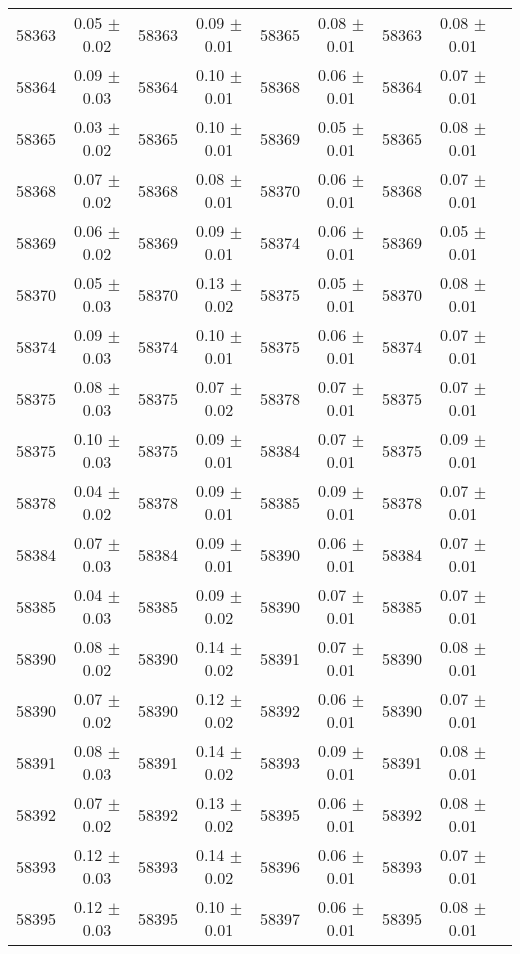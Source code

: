 \begin{center}
\begin{longtable}{ccccccccc}
58363 & 0.05 $\pm$ 0.02 & 58363 & 0.09 $\pm$ 0.01 & 58365 & 0.08 $\pm$ 0.01 & 58363 & 0.08 $\pm$ 0.01 & \\
58364 & 0.09 $\pm$ 0.03 & 58364 & 0.10 $\pm$ 0.01 & 58368 & 0.06 $\pm$ 0.01 & 58364 & 0.07 $\pm$ 0.01 & \\
58365 & 0.03 $\pm$ 0.02 & 58365 & 0.10 $\pm$ 0.01 & 58369 & 0.05 $\pm$ 0.01 & 58365 & 0.08 $\pm$ 0.01 & \\
58368 & 0.07 $\pm$ 0.02 & 58368 & 0.08 $\pm$ 0.01 & 58370 & 0.06 $\pm$ 0.01 & 58368 & 0.07 $\pm$ 0.01 & \\
58369 & 0.06 $\pm$ 0.02 & 58369 & 0.09 $\pm$ 0.01 & 58374 & 0.06 $\pm$ 0.01 & 58369 & 0.05 $\pm$ 0.01 & \\
58370 & 0.05 $\pm$ 0.03 & 58370 & 0.13 $\pm$ 0.02 & 58375 & 0.05 $\pm$ 0.01 & 58370 & 0.08 $\pm$ 0.01 & \\
58374 & 0.09 $\pm$ 0.03 & 58374 & 0.10 $\pm$ 0.01 & 58375 & 0.06 $\pm$ 0.01 & 58374 & 0.07 $\pm$ 0.01 & \\
58375 & 0.08 $\pm$ 0.03 & 58375 & 0.07 $\pm$ 0.02 & 58378 & 0.07 $\pm$ 0.01 & 58375 & 0.07 $\pm$ 0.01 & \\
58375 & 0.10 $\pm$ 0.03 & 58375 & 0.09 $\pm$ 0.01 & 58384 & 0.07 $\pm$ 0.01 & 58375 & 0.09 $\pm$ 0.01 & \\
58378 & 0.04 $\pm$ 0.02 & 58378 & 0.09 $\pm$ 0.01 & 58385 & 0.09 $\pm$ 0.01 & 58378 & 0.07 $\pm$ 0.01 & \\
58384 & 0.07 $\pm$ 0.03 & 58384 & 0.09 $\pm$ 0.01 & 58390 & 0.06 $\pm$ 0.01 & 58384 & 0.07 $\pm$ 0.01 & \\
58385 & 0.04 $\pm$ 0.03 & 58385 & 0.09 $\pm$ 0.02 & 58390 & 0.07 $\pm$ 0.01 & 58385 & 0.07 $\pm$ 0.01 & \\
58390 & 0.08 $\pm$ 0.02 & 58390 & 0.14 $\pm$ 0.02 & 58391 & 0.07 $\pm$ 0.01 & 58390 & 0.08 $\pm$ 0.01 & \\
58390 & 0.07 $\pm$ 0.02 & 58390 & 0.12 $\pm$ 0.02 & 58392 & 0.06 $\pm$ 0.01 & 58390 & 0.07 $\pm$ 0.01 & \\
58391 & 0.08 $\pm$ 0.03 & 58391 & 0.14 $\pm$ 0.02 & 58393 & 0.09 $\pm$ 0.01 & 58391 & 0.08 $\pm$ 0.01 & \\
58392 & 0.07 $\pm$ 0.02 & 58392 & 0.13 $\pm$ 0.02 & 58395 & 0.06 $\pm$ 0.01 & 58392 & 0.08 $\pm$ 0.01 & \\
58393 & 0.12 $\pm$ 0.03 & 58393 & 0.14 $\pm$ 0.02 & 58396 & 0.06 $\pm$ 0.01 & 58393 & 0.07 $\pm$ 0.01 & \\
58395 & 0.12 $\pm$ 0.03 & 58395 & 0.10 $\pm$ 0.01 & 58397 & 0.06 $\pm$ 0.01 & 58395 & 0.08 $\pm$ 0.01 & \\

\end{longtable}
\end{center}

